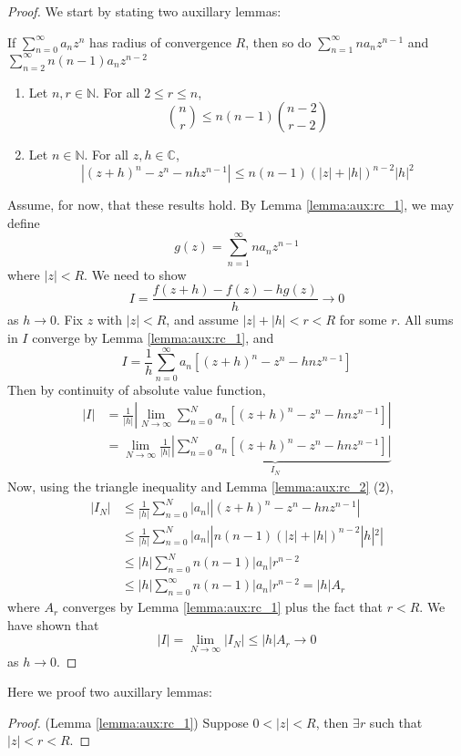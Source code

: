 \documentclass[10pt, a4paper, twoside]{report}
\begin{document}
\begin{proof} We start by stating two auxillary lemmas:
    \begin{lemma}
        If \(\sum_{n=0}^{\infty}a_nz^n\) has radius of convergence \(R\), then so do \(\sum_{n=1}^{\infty}na_nz^{n-1}\) \newline and  \(\sum_{n=2}^{\infty}n(n-1)a_nz^{n-2}\)
        \label{lemma:aux:rc_1}
    \end{lemma}
    \begin{lemma}\item[]
        \begin{enumerate} 
            \item Let \(n,r\in\mathbb{N}\). For all \( 2\leq r\leq n \),
            \[\binom nr\leq n(n-1)\binom{n-2}{r-2}\]
            \item Let \(n\in\mathbb{N}\). For all \(z,h\in\mathbb{C}\),
            \[|(z+h)^n-z^n-nhz^{n-1}|\leq n(n-1)(|z|+|h|)^{n-2}|h|^2\]
        \end{enumerate}
        \label{lemma:aux:rc_2}
    \end{lemma}
    Assume, for now, that these results hold. By Lemma \ref{lemma:aux:rc_1}, we may define 
    \[g(z)=\sum_{n=1}^{\infty}na_nz^{n-1}\]
    where \(|z|<R\). We need to show 
    \[I=\frac{f(z+h)-f(z)-hg(z)}{h}\to 0\]
    as \(h\to 0\). Fix \(z\) with \(|z|<R\), and assume \(|z|+|h|<r<R\) for some \(r\). All sums in \(I\) converge by Lemma \ref{lemma:aux:rc_1}, and 
    \[I=\frac 1h\sum_{n=0}^\infty a_n[(z+h)^n-z^n-hnz^{n-1}]\]
    Then by continuity of absolute value function,
    \begin{align*}
        |I|&=\frac 1{|h|}\left|\lim_{N\to\infty}\sum_{n=0}^{N} a_n[(z+h)^n-z^n-hnz^{n-1}]\right| \\
        &=\lim_{N\to\infty}\underbrace{\frac 1{|h|}\left|\sum_{n=0}^{N} a_n[(z+h)^n-z^n-hnz^{n-1}]\right|}_{I_N}
    \end{align*}
    Now, using the triangle inequality and Lemma \ref{lemma:aux:rc_2} (2), 
    \begin{align*}
        |I_N|&\leq\frac 1{|h|}\sum_{n=0}^{N}|a_n||(z+h)^n-z^n-hnz^{n-1}| \\
        &\leq\frac 1{|h|}\sum_{n=0}^{N}|a_n||n(n-1)(|z|+|h|)^{n-2}|h|^2| \\
        &\leq |h|\sum_{n=0}^{N}n(n-1)|a_n|r^{n-2} \\
        &\leq |h|\sum_{n=0}^\infty n(n-1)|a_n|r^{n-2} =|h|A_r
    \end{align*}
    where \(A_r\) converges by Lemma \ref{lemma:aux:rc_1} plus the fact that \(r<R\). We have shown that 
    \[|I|=\lim_{N\to\infty}|I_N|\leq|h|A_r\to 0\]
    as \(h\to 0\).
\end{proof}
Here we proof two auxillary lemmas:
\begin{proof}
    (Lemma \ref{lemma:aux:rc_1}) Suppose \(0<|z|<R\), then \(\exists r\) such that \(|z|<r<R\).
\end{proof}
\end{document}
